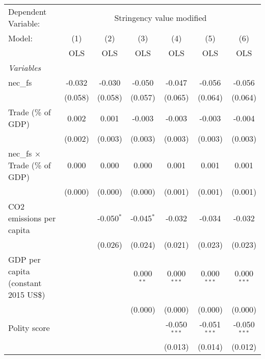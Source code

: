 
\begingroup
\centering
\begin{tabular}{lcccccc}
   \toprule
   Dependent Variable: & \multicolumn{6}{c}{Stringency value modified}\\
   Model:                                & (1)     & (2)          & (3)          & (4)            & (5)            & (6)\\  
                                         &  OLS    & OLS          & OLS          & OLS            & OLS            & OLS\\  
   \midrule
   \emph{Variables}\\
   nec\_fs                               & -0.032  & -0.030       & -0.050       & -0.047         & -0.056         & -0.056\\   
                                         & (0.058) & (0.058)      & (0.057)      & (0.065)        & (0.064)        & (0.064)\\   
   Trade (\% of GDP)                     & 0.002   & 0.001        & -0.003       & -0.003         & -0.003         & -0.004\\   
                                         & (0.002) & (0.003)      & (0.003)      & (0.003)        & (0.003)        & (0.003)\\   
   nec\_fs $\times$ Trade (\% of GDP)    & 0.000   & 0.000        & 0.000        & 0.001          & 0.001          & 0.001\\   
                                         & (0.000) & (0.000)      & (0.000)      & (0.001)        & (0.001)        & (0.001)\\   
   CO2 emissions per capita              &         & -0.050$^{*}$ & -0.045$^{*}$ & -0.032         & -0.034         & -0.032\\   
                                         &         & (0.026)      & (0.024)      & (0.021)        & (0.023)        & (0.023)\\   
   GDP per capita (constant 2015 US\$)   &         &              & 0.000$^{**}$ & 0.000$^{***}$  & 0.000$^{***}$  & 0.000$^{***}$\\   
                                         &         &              & (0.000)      & (0.000)        & (0.000)        & (0.000)\\   
   Polity score                          &         &              &              & -0.050$^{***}$ & -0.051$^{***}$ & -0.050$^{***}$\\   
                                         &         &              &              & (0.013)        & (0.014)        & (0.012)\\   

\end{tabular}
